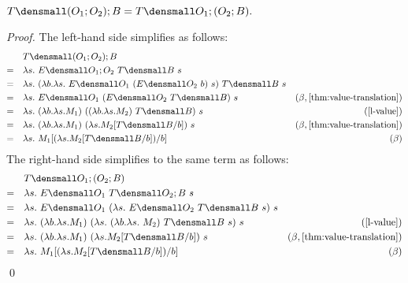 \begin{lemma}
  \label{thm:templ-compose-assoc}
  \\
  $ T\den{(O_1;O_2);B} = T\den{O_1;(O_2;B)}.$
\end{lemma}
\begin{proof}
  The left-hand side simplifies as follows:
  \begin{align*}
    &\quad T\den{(O_1;O_2);B} \\
    =& \quad \lambda s.~ E\den{O_1;O_2} ~T\den{B} ~s \\
    =& \quad \lambda s.~ (\lambda b. \lambda s.~ E\den{O_1} ~(E\den{O_2} ~b) ~s) ~T\den{B} ~s \\
    =& \quad \lambda s.~ E\den{O_1} ~(E\den{O_2} ~T\den{B}) ~s & (\beta, \cref{thm:value-translation}) \\
    =& \quad \lambda s.~ (\lambda b.\lambda s. M_1) ~((\lambda b. \lambda s. M_2) ~T\den{B}) ~s & (\cref{l-value}) \\
    =& \quad \lambda s.~ (\lambda b.\lambda s. M_1) ~(\lambda s. M_2\subst{b}{T\den{B}}) ~s & (\beta, \cref{thm:value-translation}) \\
    =& \quad \lambda s.~ M_1\subst{b}{(\lambda s. M_2\subst{b}{T\den{B}})} & (\beta) \\
  \end{align*}
  The right-hand side simplifies to the same term as follows:
  \begin{align*}
    &\quad T\den{O_1;(O_2;B)} \\
    =& \quad \lambda s.~ E\den{O_1} ~T\den{O_2;B} ~s \\
    =& \quad \lambda s.~ E\den{O_1} ~(\lambda s. ~E\den{O_2} ~T\den{B} ~s) ~s \\
    =& \quad \lambda s.~ (\lambda b. \lambda s. M_1) ~(\lambda s. ~(\lambda b. \lambda s.~ M_2) ~T\den{B} ~s) ~s & (\cref{l-value}) \\
    =& \quad \lambda s.~ (\lambda b. \lambda s. M_1) ~(\lambda s. M_2\subst{b}{T\den{B}}) ~s & (\beta, \cref{thm:value-translation}) \\
    =& \quad \lambda s.~ M_1\subst{b}{(\lambda s. M_2\subst{b}{T\den{B}})} & (\beta) \\
  \end{align*}
  \qed
\end{proof}

